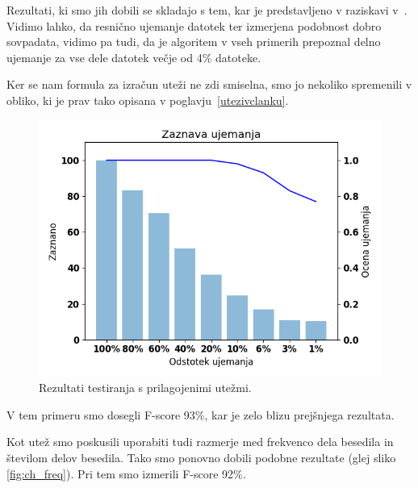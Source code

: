 \documentclass{acm_proc_article-sp}
\begin{document}
Rezultati, ki smo jih dobili se skladajo s tem, kar je predstavljeno v raziskavi v~\cite{fbhash}. Vidimo lahko, da resnično ujemanje datotek ter izmerjena podobnost dobro sovpadata, vidimo pa tudi, da je algoritem v vseh primerih prepoznal delno ujemanje za vse dele datotek večje od 4\% datoteke.

Ker se nam formula za izračun uteži ne zdi smiselna, smo jo nekoliko spremenili v obliko, ki je prav tako opisana v poglavju~\ref{utezivclanku}.

\begin{figure}[htb]
\begin{center}
\includegraphics[width=1\columnwidth]{ch_tfidf_weight_majhna.png}
\end{center}
\caption{\small{Rezultati testiranja s prilagojenimi utežmi.}}
\label{fig:ch_tfidf}
\end{figure}

V tem primeru smo dosegli F-score 93\%, kar je zelo blizu prejšnjega rezultata.

Kot utež smo poskusili uporabiti tudi razmerje med frekvenco dela besedila in številom delov besedila. Tako smo ponovno dobili podobne rezultate (glej sliko \ref{fig:ch_freq}). Pri tem smo izmerili F-score 92\%.
\end{document}
